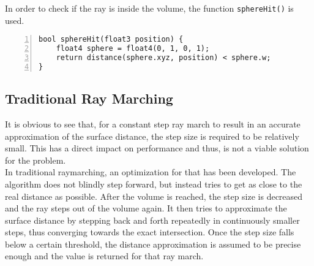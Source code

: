 \noindent
In order to check if the ray is inside the volume, the function \lstinline[language=HLSL]{sphereHit()} is used.

\begin{lstlisting}[language=HLSL, numbers=left, caption=Implementation of a volume distance function for a sphere.,captionpos=b, label=lst:shader:raymarch:spherehit]
bool sphereHit(float3 position) {
    float4 sphere = float4(0, 1, 0, 1);
    return distance(sphere.xyz, position) < sphere.w;
}
\end{lstlisting}

\pagebreak
\subsection{Traditional Ray Marching}
It is obvious to see that, for a constant step ray march to result in an accurate approximation of the surface distance, the step size is required to be relatively small.
This has a direct impact on performance and thus, is not a viable solution for the problem.
\\
In traditional \gls{raymarching}, an optimization for that has been developed. The algorithm does not blindly step forward, but instead tries to get as close to the real distance as possible.
After the volume is reached, the step size is decreased and the ray steps out of the volume again. It then tries to approximate the surface distance by stepping back and forth repeatedly in continuously smaller steps, thus converging towards the exact intersection.
Once the step size falls below a certain threshold, the distance approximation is assumed to be precise enough and the value is returned for that ray march.

